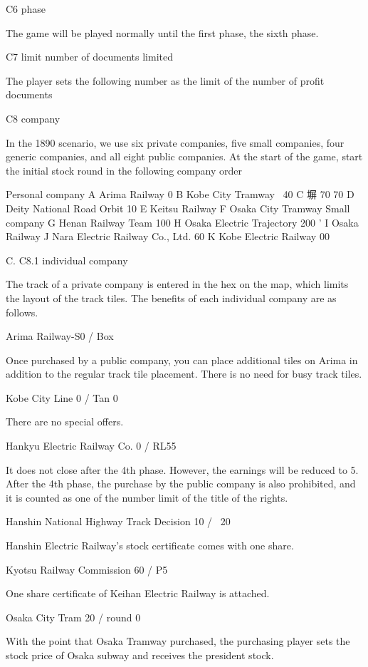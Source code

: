 \documentclass{article}
\begin{document}
\begin{CJK}{UTF8}{min}
C6 phase

The game will be played normally until the first phase, the sixth phase.

C7 limit number of documents limited

The player sets the following number as the limit of the number of profit documents

C8 company

In the 1890 scenario, we use six private companies, five small companies, four generic companies, and all eight public companies. At the start of the game, start the initial stock round in the following company order

Personal company
A Arima Railway 0
B Kobe City Tramway \ 40
C 塀 70 70
D Deity National Road Orbit 10
E Keitsu Railway 
F Osaka City Tramway 
Small company
G Henan Railway Team 100
H Osaka Electric Trajectory 200 '
I Osaka Railway 
J Nara Electric Railway Co., Ltd. 60
K Kobe Electric Railway 00

C. C8.1 individual company

The track of a private company is entered in the hex on the map, which limits the layout of the track tiles. The benefits of each individual company are as follows.

Arima Railway-S0 / Box

Once purchased by a public company, you can place additional tiles on Arima in addition to the regular track tile placement. There is no need for busy track tiles.

Kobe City Line 0 / Tan 0

There are no special offers.

Hankyu Electric Railway Co. 0 / RL55

It does not close after the 4th phase. However, the earnings will be reduced to 5. After the 4th phase, the purchase by the public company is also prohibited, and it is counted as one of the number limit of the title of the rights.

Hanshin National Highway Track Decision 10 / \ 20

Hanshin Electric Railway's stock certificate comes with one share.

Kyotsu Railway Commission 60 / P5

One share certificate of Keihan Electric Railway is attached.

Osaka City Tram 20 / round 0

With the point that Osaka Tramway purchased, the purchasing player sets the stock price of Osaka subway and receives the president stock.


\end{CJK}
\end{document}
